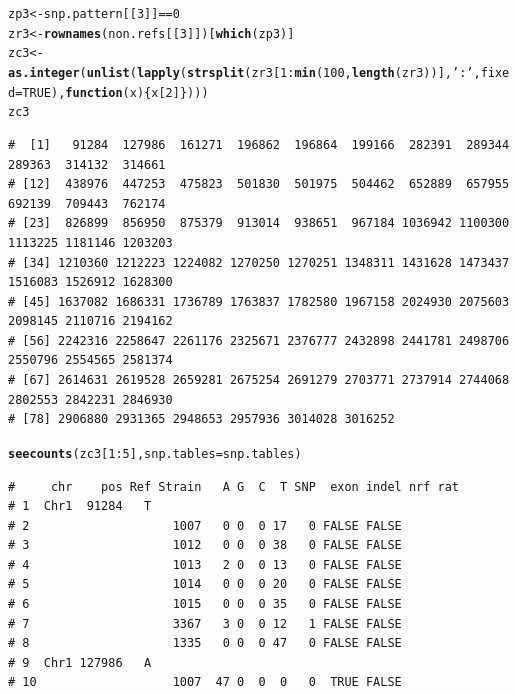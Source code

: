 \documentclass{article}\usepackage[]{graphicx}\usepackage[]{color}
\makeatletter
\newcommand{\hlnum}[1]{\textcolor[rgb]{0.686,0.059,0.569}{#1}}%
\newcommand{\hlstr}[1]{\textcolor[rgb]{0.192,0.494,0.8}{#1}}%
\newcommand{\hlopt}[1]{\textcolor[rgb]{0,0,0}{#1}}%
\newcommand{\hlstd}[1]{\textcolor[rgb]{0.345,0.345,0.345}{#1}}%
\newcommand{\hlkwa}[1]{\textcolor[rgb]{0.161,0.373,0.58}{\textbf{#1}}}%
\newcommand{\hlkwb}[1]{\textcolor[rgb]{0.69,0.353,0.396}{#1}}%
\newcommand{\hlkwc}[1]{\textcolor[rgb]{0.333,0.667,0.333}{#1}}%
\newcommand{\hlkwd}[1]{\textcolor[rgb]{0.737,0.353,0.396}{\textbf{#1}}}%
\newenvironment{kframe}{%
 \def\at@end@of@kframe{}%
 \ifinner\ifhmode%
  \def\at@end@of@kframe{\end{minipage}}%
  \begin{minipage}{\columnwidth}%
 \fi\fi%
 \def\FrameCommand##1{\hskip\@totalleftmargin \hskip-\fboxsep
 \colorbox{shadecolor}{##1}\hskip-\fboxsep
     \hskip-\linewidth \hskip-\@totalleftmargin \hskip\columnwidth}%
 \MakeFramed {\advance\hsize-\width
   \@totalleftmargin\z@ \linewidth\hsize
   \@setminipage}}%
 {\par\unskip\endMakeFramed%
 \at@end@of@kframe}
\newenvironment{knitrout}{}{} %
\makeatother
\begin{document}
\begin{knitrout}\footnotesize
{}\color{fgcolor}\begin{kframe}
\begin{alltt}
\hlstd{zp3} \hlkwb{<-} \hlstd{snp.pattern[[}\hlnum{3}\hlstd{]]} \hlopt{==} \hlnum{0}
\hlstd{zr3} \hlkwb{<-} \hlkwd{rownames}\hlstd{(non.refs[[}\hlnum{3}\hlstd{]])[}\hlkwd{which}\hlstd{(zp3)]}
\hlstd{zc3} \hlkwb{<-} \hlkwd{as.integer}\hlstd{(}\hlkwd{unlist}\hlstd{(}\hlkwd{lapply}\hlstd{(}\hlkwd{strsplit}\hlstd{(zr3[}\hlnum{1}\hlopt{:}\hlkwd{min}\hlstd{(}\hlnum{100}\hlstd{,}\hlkwd{length}\hlstd{(zr3))],}\hlstr{':'}\hlstd{,}\hlkwc{fixed}\hlstd{=}\hlnum{TRUE}\hlstd{),}\hlkwa{function}\hlstd{(}\hlkwc{x}\hlstd{)\{x[}\hlnum{2}\hlstd{]\})))}
\hlstd{zc3}
\end{alltt}
\begin{verbatim}
#  [1]   91284  127986  161271  196862  196864  199166  282391  289344  289363  314132  314661
# [12]  438976  447253  475823  501830  501975  504462  652889  657955  692139  709443  762174
# [23]  826899  856950  875379  913014  938651  967184 1036942 1100300 1113225 1181146 1203203
# [34] 1210360 1212223 1224082 1270250 1270251 1348311 1431628 1473437 1516083 1526912 1628300
# [45] 1637082 1686331 1736789 1763837 1782580 1967158 2024930 2075603 2098145 2110716 2194162
# [56] 2242316 2258647 2261176 2325671 2376777 2432898 2441781 2498706 2550796 2554565 2581374
# [67] 2614631 2619528 2659281 2675254 2691279 2703771 2737914 2744068 2802553 2842231 2846930
# [78] 2906880 2931365 2948653 2957936 3014028 3016252
\end{verbatim}
\begin{alltt}
\hlkwd{seecounts}\hlstd{(zc3[}\hlnum{1}\hlopt{:}\hlnum{5}\hlstd{],} \hlkwc{snp.tables}\hlstd{=snp.tables)}
\end{alltt}
\begin{verbatim}
#     chr    pos Ref Strain   A G  C  T SNP  exon indel nrf rat
# 1  Chr1  91284   T                                           
# 2                    1007   0 0  0 17   0 FALSE FALSE        
# 3                    1012   0 0  0 38   0 FALSE FALSE        
# 4                    1013   2 0  0 13   0 FALSE FALSE        
# 5                    1014   0 0  0 20   0 FALSE FALSE        
# 6                    1015   0 0  0 35   0 FALSE FALSE        
# 7                    3367   3 0  0 12   1 FALSE FALSE        
# 8                    1335   0 0  0 47   0 FALSE FALSE        
# 9  Chr1 127986   A                                           
# 10                   1007  47 0  0  0   0  TRUE FALSE        

\end{verbatim}
\end{kframe}
\end{knitrout}
\end{document}

